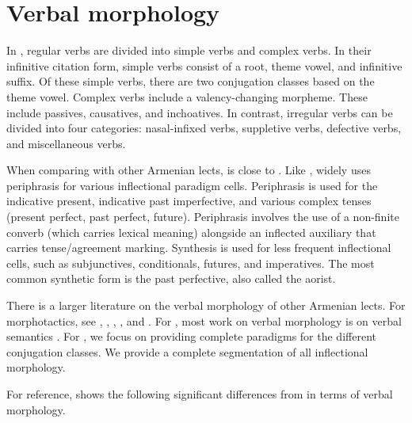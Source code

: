 \chapter{Verbal morphology}\label{chapter: verb}\largerpage

In {\iaIA}, regular verbs are divided into simple verbs and complex verbs. In their infinitive citation form, simple verbs consist of a root, theme vowel, and infinitive suffix. Of these simple verbs, there are two conjugation classes based on the theme vowel. Complex verbs include a valency-changing morpheme. These include passives, causatives, and inchoatives. In contrast, irregular verbs can be divided into four categories: nasal-infixed verbs, suppletive verbs, defective verbs, and miscellaneous verbs.

When comparing {\iaIA} with other Armenian lects, {\iaIA} is close to {\seaSEA}. Like {\seaSE}, {\iaIA} widely uses periphrasis for various inflectional paradigm cells. Periphrasis is used for the indicative present, indicative past imperfective, and various complex tenses (present perfect, past perfect, future). Periphrasis involves the use of a non-finite converb (which carries lexical meaning) alongside an inflected auxiliary that carries tense/agreement marking. Synthesis is used for less frequent inflectional cells, such as subjunctives, conditionals, futures, and imperatives. The most common synthetic form is the past perfective, also called the aorist. 

There is a larger literature on the verbal morphology of other Armenian lects. For {\swaSWA} morphotactics, see \citet{Donabedian-1997-NeutralisationdeLaDiatheseDesParticipesEnAcDeLArmenianModerneOccidental}, \citet{Boyacioglu-2010-HayPayVerbsArmenianOccidentalWestArmenian}, \citet{boyaciogluDolatian-2020-ArmenianVerbs}, \citet{DolatianGuekguezian-prep-TierBasedLocalityArmenianConjugationClass,DolatianGuekguezian-prep-Morphome}, and \citet{KarakasDolatainGuekguezian-prep-DisentanglingTesnseAgreementWesternArmenian}. For {\seaSEA}, most work on verbal morphology is on   verbal semantics \citep{Kozintseva-1995-EasternBook,DumTragut-2009-ArmenianReferenceGrammar,DanielKhurshudyan-2015-ValancyClassesinEasternArmenian,Plungian-2018-EastArmNotesVerbalParadigmStems}. For {\iaIA}, we focus on providing complete paradigms for the different conjugation classes. We provide a complete segmentation of all inflectional morphology.

For reference, {\iaIA} shows the following significant differences from {\seaSEA} in terms of verbal morphology. 

